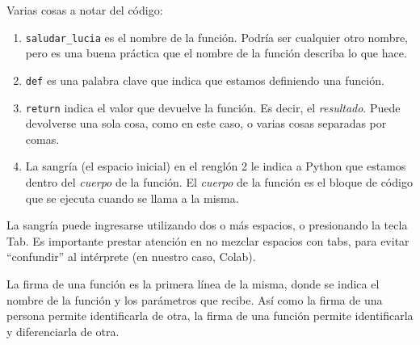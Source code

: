 \documentclass[
  letterpaper,
  DIV=11,
  numbers=noendperiod]{scrreprt}
\providecommand{\tightlist}{%
  \setlength{\itemsep}{0pt}\setlength{\parskip}{0pt}}\usepackage{longtable,booktabs,array}
\begin{document}
Varias cosas a notar del código:

\begin{enumerate}
\def\labelenumi{\arabic{enumi}.}
\tightlist
\item
  \texttt{saludar\_lucia} es el nombre de la función. Podría ser
  cualquier otro nombre, pero es una buena práctica que el nombre de la
  función describa lo que hace.\\
\item
  \texttt{def} es una palabra clave que indica que estamos definiendo
  una función.\\
\item
  \texttt{return} indica el valor que devuelve la función. Es decir, el
  \emph{resultado}. Puede devolverse una sola cosa, como en este caso, o
  varias cosas separadas por comas.\\
\item
  La sangría (el espacio inicial) en el renglón 2 le indica a Python que
  estamos dentro del \emph{cuerpo} de la función. El \emph{cuerpo} de la
  función es el bloque de código que se ejecuta cuando se llama a la
  misma.\\
\end{enumerate}

\begin{tcolorbox}[enhanced jigsaw, arc=.35mm, toptitle=1mm, colframe=quarto-callout-note-color-frame, bottomtitle=1mm, opacitybacktitle=0.6, colbacktitle=quarto-callout-note-color!10!white, leftrule=.75mm, coltitle=black, toprule=.15mm, titlerule=0mm, title=\textcolor{quarto-callout-note-color}{\faInfo}\hspace{0.5em}{Sangría}, bottomrule=.15mm, rightrule=.15mm, colback=white, breakable, opacityback=0, left=2mm]

La sangría puede ingresarse utilizando dos o más espacios, o presionando
la tecla Tab. Es importante prestar atención en no mezclar espacios con
tabs, para evitar ``confundir'' al intérprete (en nuestro caso, Colab).

\end{tcolorbox}

\begin{tcolorbox}[enhanced jigsaw, arc=.35mm, toptitle=1mm, colframe=quarto-callout-tip-color-frame, bottomtitle=1mm, opacitybacktitle=0.6, colbacktitle=quarto-callout-tip-color!10!white, leftrule=.75mm, coltitle=black, toprule=.15mm, titlerule=0mm, title=\textcolor{quarto-callout-tip-color}{\faLightbulb}\hspace{0.5em}{Firma de la función}, bottomrule=.15mm, rightrule=.15mm, colback=white, breakable, opacityback=0, left=2mm]

La firma de una función es la primera línea de la misma, donde se indica
el nombre de la función y los parámetros que recibe. Así como la firma
de una persona permite identificarla de otra, la firma de una función
permite identificarla y diferenciarla de otra.

\end{tcolorbox}
\end{document}
